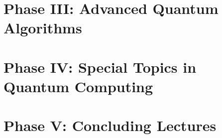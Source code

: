 \documentclass{report}
\begin{document}
\chapter{Phase III: Advanced Quantum Algorithms}

\chapter{Phase IV: Special Topics in Quantum Computing}

\chapter{Phase V: Concluding Lectures}
\end{document}
